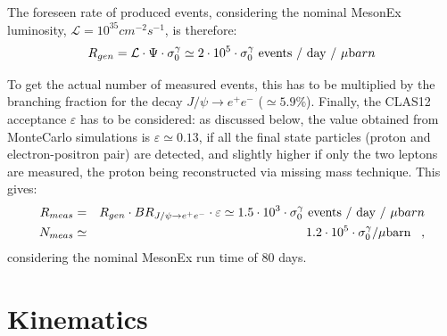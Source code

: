 \documentclass[a4paper,10pt]{article}
\begin{document}
The foreseen rate of produced events, considering the nominal MesonEx luminosity, $\mathcal{L}=10^{35} cm^{-2} s^{-1}$, is therefore:
 \begin{equation}
R_{gen} = \mathcal{L} \cdot \Psi \cdot \sigma^{\gamma}_0 \simeq 2 \cdot 10^5 \cdot \sigma^{\gamma}_0 \mbox{ events / day / }\mu{\mbox barn}
\end{equation}

To get the actual number of measured events, this has to be multiplied by the branching fraction for the decay $J/\psi\rightarrow e^{+} e^{-}$ ($\simeq 5.9\%$). Finally, the CLAS12 acceptance $\varepsilon$ has to be considered: as discussed below, the value obtained from MonteCarlo simulations is $\varepsilon \simeq 0.13$, if all the final state particles (proton and electron-positron pair) are detected, and slightly higher if only the two leptons are measured, the proton being reconstructed via missing mass technique. This gives:
\begin{eqnarray}
R_{meas} &=& R_{gen} \cdot BR_{J/\psi\rightarrow e^{+}e^{-}} \cdot \varepsilon \simeq 1.5 \cdot 10^{3}  \cdot \sigma^{\gamma}_0 \mbox{ events / day / }\mu{\mbox barn}\\
 N_{meas} &\simeq& 1.2\cdot10^5 \cdot \sigma^{\gamma}_0 / \mu\mbox{barn} \; \; \; ,
\end{eqnarray}
considering the nominal MesonEx run time of 80 days. 
\section{Kinematics}
 
\end{document}
